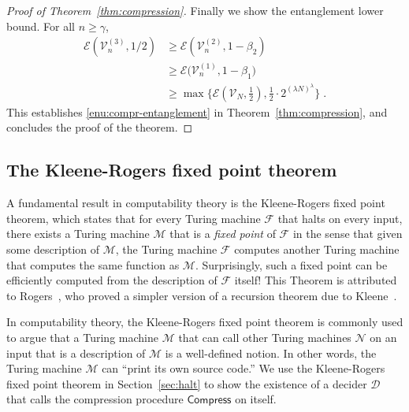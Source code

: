 \documentclass[11pt]{article}
\theoremstyle{definition}
\newcommand{\decider}{\mathcal{D}}
\newcommand{\verifier}{\mathcal{V}}
\newcommand{\Ent}{\mathscr{E}}
\renewcommand{\cal}[1]{\mathcal{#1}}
\newcommand{\tmstyle}[1]{\ensuremath{\mathsf{#1}}}
\newcommand{\Compress}{\tmstyle{Compress}}
\begin{document}
\begin{proof}[Proof of Theorem~\ref{thm:compression}]
  Finally we show the entanglement lower bound.
  For all $n \geq \gamma$,
  \begin{align*}
    \Ent(\verifier^{(3)}_n, 1/2)
    & \geq \Ent \left (\verifier^{(2)}_n, 1 - \beta_2 \right) \\
    & \geq \Ent \Big (\verifier^{(1)}_n, 1 - \beta_1 \Big ) \\
    & \geq \max \Big \{ \Ent(\verifier_N, \frac{1}{2}),\frac{1}{2} \cdot
      2^{(\lambda N)^\lambda} \Big \}\;.
  \end{align*}
  This establishes \cref{enu:compr-entanglement} in
  Theorem~\ref{thm:compression}, and concludes the proof of the theorem.
\end{proof}

\subsection{The Kleene-Rogers fixed point theorem}
\label{sec:kleene}

A fundamental result in computability theory is the Kleene-Rogers fixed point
theorem, which states that for every Turing machine $\cal{F}$ that halts on
every input, there exists a Turing machine $\cal{M}$ that is a \emph{fixed
  point} of $\cal{F}$ in the sense that given some description of $\cal{M}$, the
Turing machine $\cal{F}$ computes another Turing machine that computes the same
function as $\cal{M}$.
Surprisingly, such a fixed point can be efficiently computed from the
description of $\cal{F}$ itself!
This Theorem is attributed to Rogers~\cite{Rogers1987}, who proved a simpler
version of a recursion theorem due to Kleene~\cite{Kleene1954}.

In computability theory, the Kleene-Rogers fixed point theorem is commonly used
to argue that a Turing machine $\cal{M}$ that can call other Turing machines
$\cal{N}$ on an input that is a description of $\cal{M}$ is a well-defined
notion.
In other words, the Turing machine $\cal{M}$ can ``print its own source code.''
We use the Kleene-Rogers fixed point theorem in Section~\ref{sec:halt} to show
the existence of a decider $\decider$ that calls the compression procedure
$\Compress$ on itself.
\end{document}
